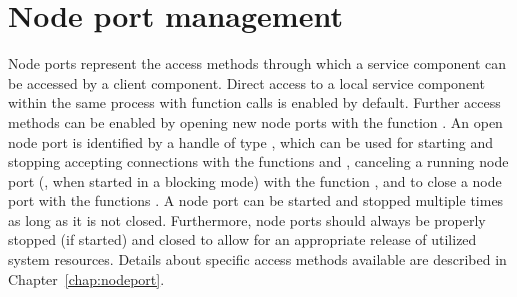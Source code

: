 \section{Node port management}
\label{sect:server_nodeport}

Node ports represent the access methods through which a service component can be accessed by a client component.
Direct access to a local service component within the same process with function calls is enabled by default.
Further access methods can be enabled by opening new node ports with the function .
An open node port is identified by a handle of type , which can be used for
starting and stopping accepting connections with the functions  and ,
canceling a running node port (\ie, when started in a blocking mode) with the function ,
and to close a node port with the functions .
A node port can be started and stopped multiple times as long as it is not closed.
Furthermore, node ports should always be properly stopped (if started) and closed to allow for an appropriate release of utilized system resources.
Details about specific access methods available are described in Chapter~\ref{chap:nodeport}.



